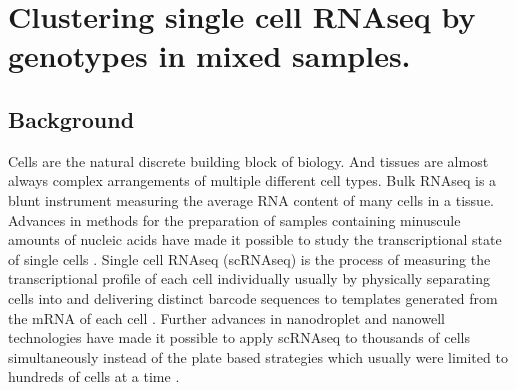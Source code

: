 
\chapter{Clustering single cell RNAseq by genotypes in mixed samples.}

\ifpdf
    \graphicspath{{Chapter2/Figs/Raster/}{Chapter2/Figs/PDF/}{Chapter2/Figs/}}
\else
    \graphicspath{{Chapter2/Figs/Vector/}{Chapter2/Figs/}}
\fi



\section{Background}
\par{
Cells are the natural discrete building block of biology. And tissues are almost always complex arrangements of multiple different cell types. Bulk RNAseq is a blunt 
instrument measuring the average RNA content of many cells in a tissue. 
Advances in methods for the preparation of samples containing minuscule amounts of nucleic acids have made it possible to study the transcriptional state of single cells \cite{first_singlecell}.
Single cell RNAseq (scRNAseq) is the process of measuring the transcriptional profile of each cell individually usually by physically separating cells into and delivering distinct barcode sequences to templates generated from the mRNA of each cell \cite{smartseq2}.
Further advances in nanodroplet and nanowell technologies have made it possible to apply scRNAseq to thousands of cells simultaneously \cite{dropseq}\cite{10xsinglecell}\cite{seqwell} instead of the plate based strategies which usually were limited to hundreds of cells at a time \cite{smartseq2}. 
} \\






